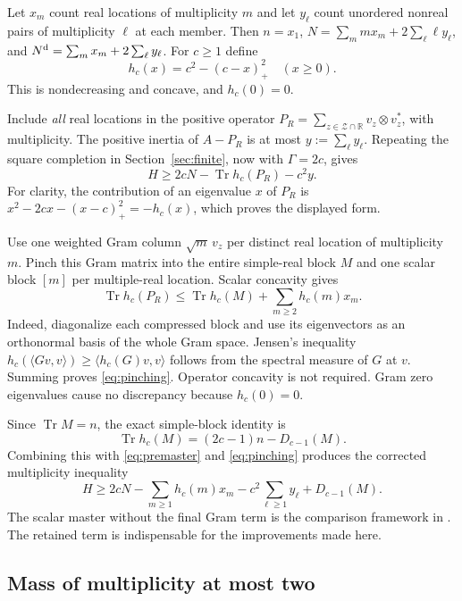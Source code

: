 \documentclass[11pt]{amsart}
\numberwithin{equation}{section}
\newcommand{\R}{\mathbb R}
\newcommand{\Tr}{\operatorname{Tr}}
\newcommand{\Nd}{N^{\rm d}}
\begin{document}
Let $x_m$ count real locations of multiplicity $m$ and let $y_\ell$
count unordered nonreal pairs of multiplicity $\ell$ at each member.
Then $n=x_1$, $N=\sum_m m x_m+2\sum_\ell\ell y_\ell$, and
$\Nd=\sum_m x_m+2\sum_\ell y_\ell$. For $c\ge1$ define
\begin{equation}
 h_c(x)=c^2-(c-x)_+^2\quad(x\ge0).\label{eq:hc}
\end{equation}
This is nondecreasing and concave, and $h_c(0)=0$.

Include \emph{all} real locations in the positive operator
$P_R=\sum_{z\in\mathcal Z\cap\R}v_z\otimes v_z^*$, with
multiplicity. The positive inertia of $A-P_R$ is at most
$y:=\sum_\ell y_\ell$. Repeating the square completion in
Section~\ref{sec:finite}, now with $\Gamma=2c$, gives
\begin{equation}
 H\ge2cN-\Tr h_c(P_R)-c^2y.\label{eq:premaster}
\end{equation}
For clarity, the contribution of an eigenvalue $x$ of $P_R$ is
$x^2-2cx-(x-c)_+^2=-h_c(x)$, which proves the displayed form.

Use one weighted Gram column $\sqrt m\,v_z$ per distinct real
location of multiplicity $m$. Pinch this Gram matrix into the entire
simple-real block $M$ and one scalar block $[m]$ per multiple-real
location. Scalar concavity gives
\begin{equation}
 \Tr h_c(P_R)\le\Tr h_c(M)+\sum_{m\ge2}h_c(m)x_m.
 \label{eq:pinching}
\end{equation}
Indeed, diagonalize each compressed block and use its eigenvectors as
an orthonormal basis of the whole Gram space. Jensen's inequality
$h_c(\langle Gv,v\rangle)\ge\langle h_c(G)v,v\rangle$ follows
from the spectral measure of $G$ at $v$. Summing proves
\eqref{eq:pinching}. Operator concavity is not required. Gram zero
eigenvalues cause no discrepancy because $h_c(0)=0$.

Since $\Tr M=n$, the exact simple-block identity is
\[
 \Tr h_c(M)=(2c-1)n-D_{c-1}(M).
\]
Combining this with \eqref{eq:premaster} and \eqref{eq:pinching}
produces the corrected multiplicity inequality
\begin{equation}
 H\ge2cN-\sum_{m\ge1}h_c(m)x_m-c^2\sum_{\ell\ge1}y_\ell
           +D_{c-1}(M).\label{eq:multiplicitymaster}
\end{equation}
The scalar master without the final Gram term is the comparison
framework in \cite{Waddle}. The retained term is indispensable for
the improvements made here.

\subsection{Mass of multiplicity at most two}
\end{document}
